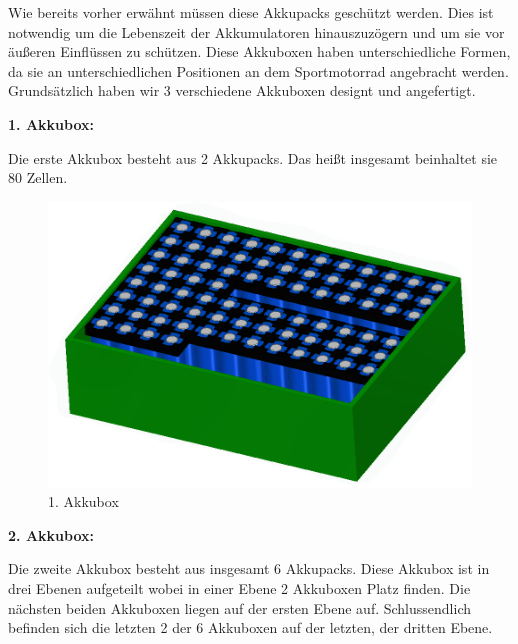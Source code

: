 Wie bereits vorher erwähnt müssen diese Akkupacks geschützt werden. Dies ist notwendig um die Lebenszeit der Akkumulatoren hinauszuzögern und um sie vor äußeren Einflüssen zu schützen. Diese Akkuboxen haben unterschiedliche Formen, da sie an unterschiedlichen Positionen an dem Sportmotorrad angebracht werden. Grundsätzlich haben wir 3 verschiedene Akkuboxen designt und angefertigt.

\textbf{1. Akkubox:}

Die erste Akkubox besteht aus 2 Akkupacks. Das heißt insgesamt beinhaltet sie 80 Zellen.

\begin{figure}[H]
	\begin{center}
		\includegraphics[scale=0.5]{figures/Akku/Akkubox1.PNG}
		\caption{1. Akkubox}
	\end{center}
\end{figure}

\textbf{2. Akkubox:}

Die zweite Akkubox besteht aus insgesamt 6 Akkupacks. Diese Akkubox ist in drei Ebenen aufgeteilt wobei in einer Ebene 2 Akkuboxen Platz finden. Die nächsten beiden Akkuboxen liegen auf der ersten Ebene auf. Schlussendlich befinden sich die letzten 2 der 6 Akkuboxen auf der letzten, der dritten Ebene.

